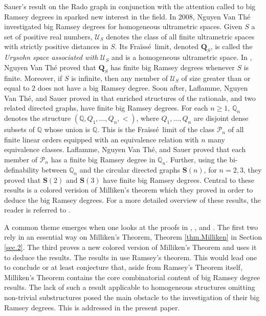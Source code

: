 \documentclass{amsart}
\theoremstyle{remark}
\theoremstyle{definition}
\theoremstyle{remark}
\newcommand{\Fraisse}{Fra{\"{i}}ss{\'{e}}}
\begin{document}
Sauer's result on the Rado graph  in conjunction with the
attention called to big Ramsey degrees  in \cite{Kechris/Pestov/Todorcevic05}
sparked new interest in the field.
In 2008,
Nguyen Van Th\'{e}
investigated big Ramsey degrees for homogeneous ultrametric spaces.
Given $S$ a set of positive real numbers,
$\mathcal{U}_S$ denotes the class of all finite ultrametric spaces  with strictly positive distances in $S$.
Its \Fraisse\ limit, denoted
$\mathbf{Q}_S$, is called the {\em Urysohn space associated with} $\mathcal{U}_S$ and is a homogeneous ultrametric space.
In  \cite{NVT08},
Nguyen Van Th\'{e} proved  that
$\mathbf{Q}_S$ has finite big Ramsey degrees whenever $S$ is finite.
Moreover, if $S$ is infinite, then any member of $\mathcal{U}_S$ of size greater than or equal to $2$ does not have a big Ramsey degree.
Soon after,
 Laflamme, Nguyen Van Th\'{e}, and Sauer proved
in
\cite{Laflamme/NVT/Sauer10}
that enriched structures of the rationals, and two related directed graphs, have  finite big Ramsey degrees.
For each $n\ge 1$,
 $\mathbb{Q}_n$ denotes the structure $(\mathbb{Q},  Q_1,\dots, Q_n,<)$, where  $Q_1,\dots, Q_n$ are disjoint dense subsets of $\mathbb{Q}$  whose union is $\mathbb{Q}$.
This is the \Fraisse\ limit of the class $\mathcal{P}_n$ of all finite linear orders equipped with an equivalence relation with  $n$ many equivalence classes.
Laflamme, Nguyen Van Th\'{e}, and Sauer proved  that
each member of $\mathcal{P}_n$ has a finite big Ramsey degree in $\mathbb{Q}_n$.
Further,
using the bi-definability between $\mathbb{Q}_n$ and the circular directed graphs $\mathbf{S}(n)$, for $n=2,3$,
they proved that
 $\mathbf{S}(2)$ and  $\mathbf{S}(3)$
have finite big Ramsey degrees.
Central to these results is a colored verision of  Milliken's theorem which they  proved in order to deduce the big Ramsey degrees.
For a more detailed overview of these results, the reader is referred to
\cite{NVTHabil}.




A common theme emerges when one looks at the proofs in \cite{DevlinThesis}, \cite{Sauer06}, and
\cite{Laflamme/NVT/Sauer10}.
The first two rely  in an essential way  on Milliken's Theorem,
Theorem \ref{thm.Milliken}  in Section \ref{sec.2}.
The third proves a new colored version of Milliken's Theorem and uses it to deduce the results.
The results in \cite{NVT08} use Ramsey's theorem.
This would lead one to conclude or at least conjecture that, aside from Ramsey's Theorem itself,  Milliken's Theorem contains the core combinatorial content of  big Ramsey degree results.
The lack of such a result applicable to  homogeneous structures omitting non-trivial substructures
posed  the main obstacle to the investigation of  their big Ramsey degrees.
This is addressed in the present paper.
\end{document}

